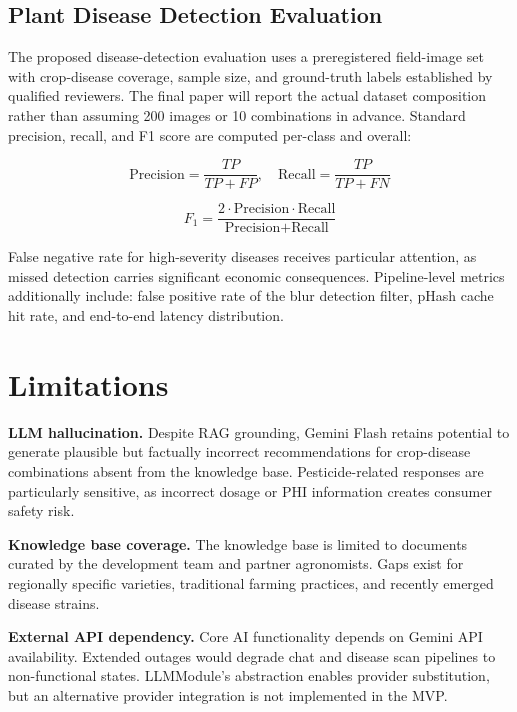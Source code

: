 \documentclass[conference]{IEEEtran}
\begin{document}
\subsection{Plant Disease Detection Evaluation}

The proposed disease-detection evaluation uses a preregistered field-image set with crop-disease coverage, sample size, and ground-truth labels established by qualified reviewers. The final paper will report the actual dataset composition rather than assuming 200 images or 10 combinations in advance. Standard precision, recall, and F1 score are computed per-class and overall:

\begin{equation}
\text{Precision} = \frac{TP}{TP + FP}, \quad \text{Recall} = \frac{TP}{TP + FN}
\end{equation}

\begin{equation}
F_1 = \frac{2 \cdot \text{Precision} \cdot \text{Recall}}{\text{Precision} + \text{Recall}}
\end{equation}

False negative rate for high-severity diseases receives particular attention, as missed detection carries significant economic consequences. Pipeline-level metrics additionally include: false positive rate of the blur detection filter, pHash cache hit rate, and end-to-end latency distribution.

\section{Limitations}

\textbf{LLM hallucination.} Despite RAG grounding, Gemini Flash retains potential to generate plausible but factually incorrect recommendations for crop-disease combinations absent from the knowledge base. Pesticide-related responses are particularly sensitive, as incorrect dosage or PHI information creates consumer safety risk.

\textbf{Knowledge base coverage.} The knowledge base is limited to documents curated by the development team and partner agronomists. Gaps exist for regionally specific varieties, traditional farming practices, and recently emerged disease strains.

\textbf{External API dependency.} Core AI functionality depends on Gemini API availability. Extended outages would degrade chat and disease scan pipelines to non-functional states. LLMModule's abstraction enables provider substitution, but an alternative provider integration is not implemented in the MVP.
\end{document}
